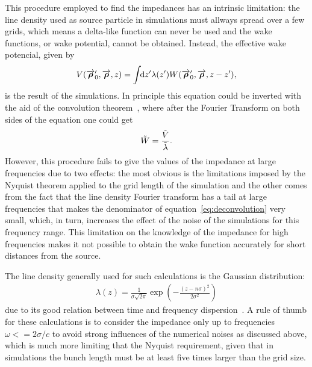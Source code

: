     This procedure employed to find the impedances has an intrinsic limitation: the line density used as source particle in simulations must allways spread over a few grids, which means a delta-like function can never be used and the wake functions, or wake potential, cannot be obtained. Instead, the effective wake potencial, given by
    \begin{align}\label{eq:int_effective_wake_potential}
        V(\overrightarrow{\boldsymbol{\rho}}'_0, \overrightarrow{\boldsymbol{\rho}}, z) = \int\!\!\text{d}z' 
                \lambda(z') W(\overrightarrow{\boldsymbol{\rho}}'_0,\overrightarrow{\boldsymbol{\rho}},z-z'),
    \end{align}
    is the result of the simulations. In principle this equation could be inverted with the aid of the convolution theorem~\cite{citehere}, where after the Fourier Transform on both sides of the equation one could get
    \begin{align}\label{eq:deconvolution}
        \tilde{W} = \frac{\tilde{V}}{\tilde{\lambda}}.
    \end{align}
    However, this procedure fails to give the values of the impedance at large frequencies due to two effects: the most obvious is the limitations imposed by the Nyquist theorem applied to the grid length of the simulation and the other comes from the fact that the line density Fourier transform has a tail at large frequencies that makes the denominator of equation~\eqref{eq:deconvolution} very small, which, in turn, increases the effect of the noise of the simulations for this frequency range. This limitation on the knowledge of the impedance for high frequencies makes it not possible to obtain the wake function accurately for short distances from the source.

    The line density generally used for such calculations is the Gaussian distribution:
    \begin{align}
        \lambda(z) = \frac{1}{\sigma\sqrt{2\pi}}
        \exp\left(-\frac{(z-n\sigma)^2}{2\sigma^2}\right)
    \end{align}
    due to its good relation between time and frequency dispersion~\cite{guyfrommagazinne}. A rule of thumb for these calculations is to consider the impedance only up to frequencies $\omega<=2\sigma/c$ to avoid strong influences of the numerical noises as discussed above, which is much more limiting that the Nyquist requirement, given that in simulations the bunch length must be at least five times larger than the grid size.


